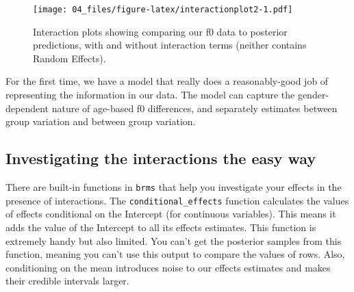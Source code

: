 \documentclass[
]{book}
\begin{document}
\begin{figure}
\centering
\texttt{[image: 04\_files/figure-latex/interactionplot2-1.pdf]}
\caption{\label{fig:interactionplot2}Interaction plots showing comparing our f0 data to posterior predictions, with and without interaction terms (neither contains Random Effects).}
\end{figure}

For the first time, we have a model that really does a reasonably-good job of representing the information in our data. The model can capture the gender-dependent nature of age-based f0 differences, and separately estimates between group variation and between group variation.

\hypertarget{investigating-the-interactions-the-easy-way}{%
\subsection{Investigating the interactions the easy way}\label{investigating-the-interactions-the-easy-way}}

There are built-in functions in \texttt{brms} that help you investigate your effects in the presence of interactions. The \texttt{conditional\_effects} function calculates the values of effects conditional on the Intercept (for continuous variables). This means it adds the value of the Intercept to all its effects estimates. This function is extremely handy but also limited. You can't get the posterior samples from this function, meaning you can't use this output to compare the values of rows. Also, conditioning on the mean introduces noise to our effects estimates and makes their credible intervals larger.
\end{document}
